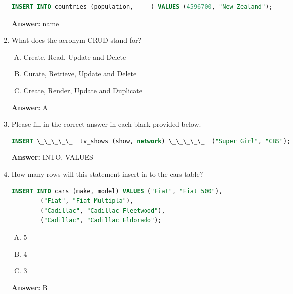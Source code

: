 \documentclass[12pt]{article}
\begin{document}
\begin{enumerate}[1.]
    \bigskip

    \begin{lstlisting}[language=SQL]
    INSERT INTO countries (population, ____) VALUES (4596700, "New Zealand");
    \end{lstlisting}

    \bigskip

    \textbf{Answer:} name

    \item

    What does the acronym CRUD stand for?

    \bigskip

    \begin{enumerate}[A.]
        \item Create, Read, Update and Delete
        \item Curate, Retrieve, Update and Delete
        \item Create, Render, Update and Duplicate
    \end{enumerate}

    \bigskip

    \textbf{Answer:} A

    \item

    Please fill in the correct answer in each blank provided below.

    \bigskip

    \begin{lstlisting}[language=SQL]
    INSERT \_\_\_\_\_  tv_shows (show, network) \_\_\_\_\_  ("Super Girl", "CBS");
    \end{lstlisting}

    \bigskip

    \textbf{Answer:} INTO, VALUES

    \item

    How many rows will this statement insert in to the cars table?

    \bigskip

    \begin{lstlisting}[language=SQL]
    INSERT INTO cars (make, model) VALUES ("Fiat", "Fiat 500"),
        ("Fiat", "Fiat Multipla"),
        ("Cadillac", "Cadillac Fleetwood"),
        ("Cadillac", "Cadillac Eldorado");
    \end{lstlisting}

    \bigskip

    \begin{enumerate}[A.]
        \item 5
        \item 4
        \item 3
    \end{enumerate}

    \bigskip

    \textbf{Answer:} B
\end{enumerate}
\end{document}
